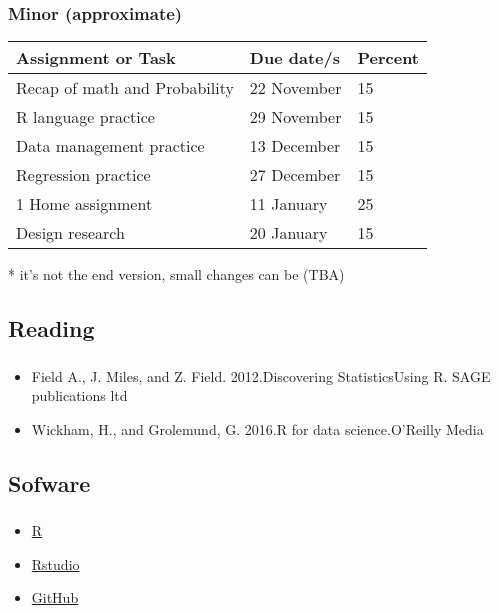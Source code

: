 \documentclass[t, 11pt]{beamer}
\begin{document}
	
\begin{frame}\label{}
	\frametitle{\insertsection}
	\frametitle{Minor  (approximate)}
	\begin{table}[]
		\begin{threeparttable}
			\begin{tabular}{@{}lll@{}}
				\toprule
				\textbf{Assignment or Task}   & \textbf{Due date/s} & \textbf{Percent} \\ \midrule
				Recap of math and Probability & 22 November         & 15      \\
				R language practice           & 29 November         & 15      \\
				Data management practice      & 13 December         & 15                \\
				Regression practice           & 27 December         & 15                \\
				1 Home assignment             & 11 January          & 25               \\
				Design research               & 20 January          & 15                \\
			\end{tabular}
			\begin{tablenotes}\footnotesize
				\item[*]  it's not the end version, small changes can be (TBA)
			\end{tablenotes}
		\end{threeparttable}
	\end{table}
\end{frame}


	
	\subsection{Reading}
	\begin{frame}\label{}
		\frametitle{\insertsection}
		\frametitle{\insertsubsection}
		\begin{itemize}
			\item Field A., J. Miles, and Z. Field. 2012.Discovering StatisticsUsing R. SAGE publications ltd
			\item Wickham, H., and Grolemund, G. 2016.R for data science.O’Reilly Media
		\end{itemize}
	\end{frame}

		\subsection{Sofware}
	\begin{frame}\label{}
		\frametitle{\insertsection}
		\frametitle{\insertsubsection}
		\begin{itemize}
			\item \href{https://www.r-project.org/}{R}
			\item \href{https://www.rstudio.com/products/rstudio/}{Rstudio}
			\item \href{https://github.com/sergeychuvakin/SAS_Quantitative_Methods/}{GitHub}
		\end{itemize}
	\end{frame}
\end{document}
